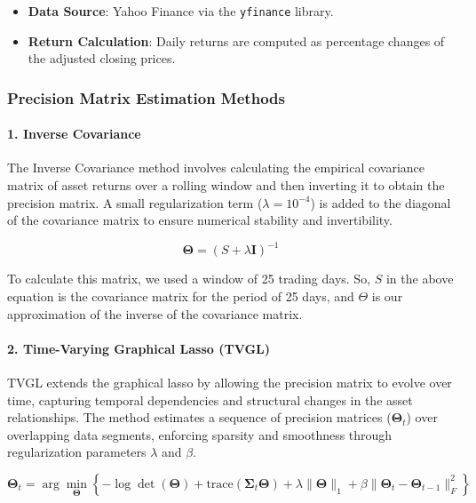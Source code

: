 \documentclass{article}
\begin{document}
\begin{itemize}
    \item \textbf{Data Source}: Yahoo Finance via the \texttt{yfinance} library.
    \item \textbf{Return Calculation}: Daily returns are computed as percentage changes of the adjusted closing prices.

\end{itemize}

\subsubsection{Precision Matrix Estimation Methods}

\paragraph{1. Inverse Covariance}

The Inverse Covariance method involves calculating the empirical covariance matrix of asset returns over a rolling window and then inverting it to obtain the precision matrix. A small regularization term (\(\lambda = 10^{-4}\)) is added to the diagonal of the covariance matrix to ensure numerical stability and invertibility.


\[
\mathbf{\Theta} = \left( S + \lambda \mathbf{I} \right)^{-1}
\]

To calculate this matrix, we used a window of 25 trading days. So, \( S \) in the above equation is the covariance matrix for the period of 25 days, and \( \Theta \) is our approximation of the inverse of the covariance matrix.

\paragraph{2. Time-Varying Graphical Lasso (TVGL)}

TVGL extends the graphical lasso by allowing the precision matrix to evolve over time, capturing temporal dependencies and structural changes in the asset relationships. The method estimates a sequence of precision matrices (\(\mathbf{\Theta}_t\)) over overlapping data segments, enforcing sparsity and smoothness through regularization parameters \(\lambda\) and \(\beta\).

\[
\mathbf{\Theta}_t = \arg\min_{\mathbf{\Theta}} \left\{ -\log \det(\mathbf{\Theta}) + \text{trace}(\mathbf{\Sigma}_t \mathbf{\Theta}) + \lambda \|\mathbf{\Theta}\|_1 + \beta \|\mathbf{\Theta}_t - \mathbf{\Theta}_{t-1}\|_F^2 \right\}
\]
\end{document}
